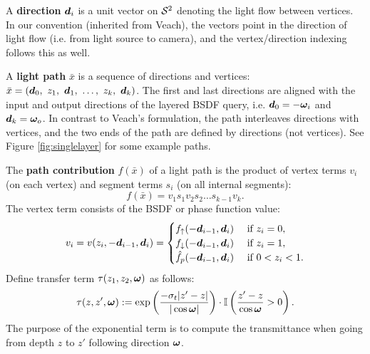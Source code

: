 A {\bf direction} $\bm{d}_i$ is a unit vector on ${\mathcal S^2}$ denoting the light flow between vertices. In our convention (inherited from Veach), 
the vectors point in the direction of light flow (i.e. from light source to camera), and the vertex/direction indexing follows this as well.

A {\bf light path} $\bar x$ is a sequence of directions and vertices: $\bar x = (\bd_0,\ z_1,\ \bd_1,\ \dots,\ z_k,\ \bd_k)$.
 The first and last directions are aligned with the input and output directions of the layered BSDF query, i.e. $\bm{d}_0 = -\bm{\omega}_i$ and $\bm{d}_k = \bm{\omega}_o$. In contrast to Veach's formulation, the path interleaves directions with vertices, and the two ends of the path are defined by directions (not vertices). See Figure \ref{fig:singlelayer} for some example paths.

The {\bf path contribution} $f(\bar x)$ of a light path is the product of vertex terms $v_i$ (on each vertex) and segment terms $s_i$ (on all internal segments):
%
\begin{equation}
	f(\bar x) = v_1 s_1 v_2 s_2 \dots s_{k-1} v_k.
\end{equation}
%
The vertex term consists of the BSDF or phase function value:
%
%
\begin{equation}
\label{eqn:vtx_contrib}
v_i = v(z_i, -\bm{d}_{i - 1}, \bm{d}_i)
= \begin{cases}
	f_\uparrow(-\bm{d}_{i-1}, \bm{d}_i)   & \mbox{  if  } z_i = 0,\\
	f_\downarrow(-\bm{d}_{i-1}, \bm{d}_i) & \mbox{  if  } z_i = 1,\\
  	\hat{f}_p(-\bm{d}_{i-1}, \bm{d}_i)    & \mbox{  if  } 0 < z_i < 1.
\end{cases}
\end{equation}
%
Define  transfer term $\tau(z_1, z_2, \bm{\omega})$ as follows:
\begin{equation}
\tau(z, z', \bm{\omega}) := \exp \left( \frac{-\sigma_t |z' - z|}{|\cos \bm{\omega}|} \right) \cdot \mathbb{I} \left( \frac{z' - z}{\cos \bm{\omega}} > 0 \right).
\end{equation}
%
The purpose of the exponential term is to compute the transmittance when going from depth $z$ to $z'$ following direction $\bm{\omega}$.
